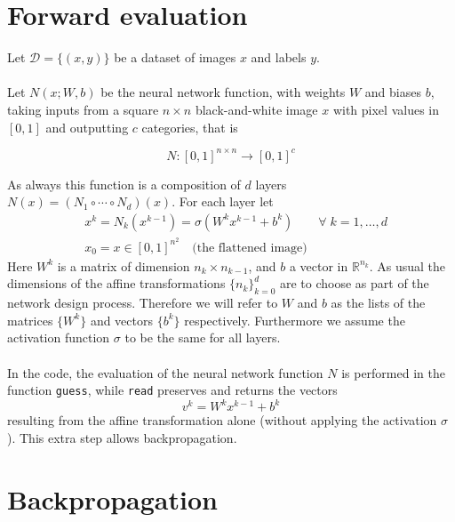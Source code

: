 \documentclass [a4paper,12pt]{article}
\begin{document}
\section{Forward evaluation}

Let $\mathcal{D} = \{(x, y)\}$ be a dataset of images $x$ and labels $y$. 
\\\\
Let $N(x; W, b)$ be the neural network function, with weights $W$ and biases $b$, taking inputs from a square $n \times n$ black-and-white image $x$ with pixel values in $[0,1]$ and outputting $c$ categories, that is

$$
N: [0,1]^{n \times n} \longrightarrow [0,1]^c
$$

As always this function is a composition of $d$ layers $N(x) = (N_1 \circ \cdots \circ N_d)(x)$. For each layer let
\begin{align*}
&x^k = N_k(x^{k-1}) = \sigma(W^k x^{k-1} + b^k) \qquad \forall \; k = 1, \dots, d \\
&x_0 = x \in [0,1]^{n^2} \quad \text{(the flattened image)}
\end{align*}
Here $W^k$ is a matrix of dimension $n_k \times n_{k-1}$, and $b$ a vector in $\mathbb{R}^{n_k}$. As usual the dimensions of the affine transformations $\{n_k\}_{k=0}^d$ are to choose as part of the network design process.
Therefore we will refer to $W$ and $b$ as the lists of the matrices $\{W^k\}$ and vectors $\{b^k\}$ respectively.
Furthermore we assume the activation function $\sigma$ to be the same for all layers.
\\\\
In the code, the evaluation of the neural network function $N$ is performed in the function \verb|guess|, while \verb|read| preserves and returns the vectors
$$
v^k = W^k x^{k-1} + b^k
$$
resulting from the affine transformation alone (without applying the activation $\sigma$). This extra step allows backpropagation.


\section{Backpropagation}
\end{document}
